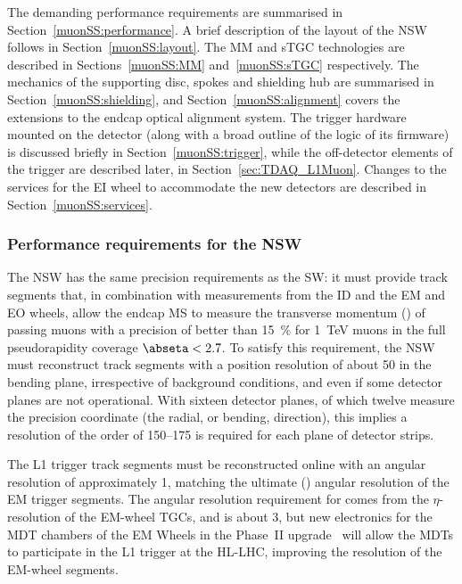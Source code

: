 \documentclass[cernpreprint, atlasdraft=false, UKenglish,british,orcidlogo, texmf, orcidlogo]{atlasdoc}
\begin{document}
The demanding performance requirements are summarised in Section~{\ref{muonSS:performance}}. A brief description of the layout of the \gls{NSW} follows in Section~{\ref{muonSS:layout}}. The \gls{MM} and \gls{sTGC} technologies are described in Sections~{\ref{muonSS:MM}} and~{\ref{muonSS:sTGC}} respectively. The mechanics of the supporting disc, spokes and shielding hub are summarised in Section~{\ref{muonSS:shielding}}, and Section~{\ref{muonSS:alignment}} covers the extensions to the endcap optical alignment system. The trigger hardware mounted on the detector (along with a broad outline of the logic of its firmware) is discussed briefly in Section~{\ref{muonSS:trigger}}, while the off-detector elements of the trigger are described later, in Section~{\ref{sec:TDAQ_L1Muon}}. Changes to the services for the EI wheel to accommodate the new detectors are described in Section~{\ref{muonSS:services}}.
 
\subsubsection{Performance requirements for the NSW \label{muonSS:performance}}
The \gls{NSW} has the same precision requirements as the \gls{SW}: it must provide track segments that, in combination with measurements from the \gls{ID} and the EM and EO wheels, allow the endcap \gls{MS} to measure the transverse momentum (\pT) of passing muons with a precision of better than \SI{15}{\percent} for \SI{1}{\TeV} muons in the full pseudorapidity coverage $\abseta < 2.7$.
To satisfy this requirement, the \gls{NSW} must reconstruct track segments with a position resolution of about \SI{50}{\micron} in the bending plane, irrespective of background conditions, and even if some detector planes are not operational. With sixteen detector planes, of which twelve measure the precision coordinate (the radial, or bending, direction), this implies a resolution of the order of \SIrange{150}{175}{\micron} is required for each plane of detector strips.
 
The \gls{L1} trigger track
segments must be reconstructed online with an angular resolution of
approximately \SI{1}{\mrad}, matching the ultimate (\RunFour) angular resolution of the EM trigger segments. The angular resolution requirement for \RunThr comes from the $\eta$-resolution of the EM-wheel \glspl{TGC}, and is about \SI{3}{\mrad}, but new electronics for the \gls{MDT} chambers of the EM Wheels in the Phase~II upgrade~\cite{ATLAS-TDR-26} will allow the \glspl{MDT} to participate in the \gls{L1} trigger at the \gls{HL-LHC}, improving the resolution of the EM-wheel segments.
 
\end{document}
